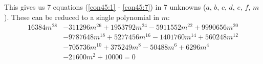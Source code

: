 \documentclass[12pt,titlepage]{article}
\numberwithin{equation}{section}
\begin{document}
This gives us 7 equations (\ref{con45:1} - \ref{con45:7}) in 7 unknowns
($a$, $b$, $c$, $d$, $e$, $f$, $m$).
These can be reduced to a single polynomial in $m$:
\begin{align*}
16384 m^{28} &-  311296 m^{26} + 1953792 m^{24} - 5911552 m^{22} + 9990656 m^{20} \\
             &- 9787648 m^{18} + 5277456 m^{16} - 1401760 m^{14} +  560248 m^{12} \\
             &-  705736 m^{10} +  375249 m^{8}  -   50488 m^{6}  +    6296 m^{4}  \\
             &-   21600 m^{2}  +   10000 = 0
\end{align*}
\end{document}
